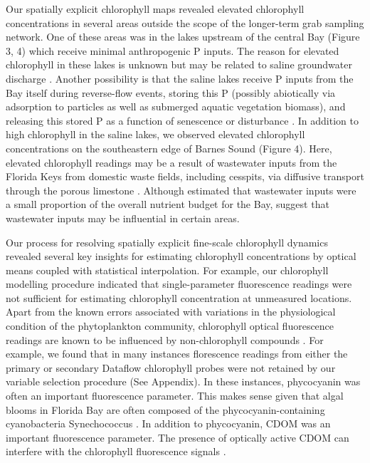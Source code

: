 Our spatially explicit chlorophyll maps revealed elevated chlorophyll concentrations in several areas outside the scope of the longer-term grab sampling network. One of these areas was in the lakes upstream of the central Bay (Figure 3, 4) which receive minimal anthropogenic P inputs. The reason for elevated chlorophyll in these lakes is unknown but may be related to saline groundwater discharge \citep{price2006coastal}. Another possibility is that the saline lakes receive P inputs from the Bay itself during reverse-flow events, storing this P (possibly abiotically via adsorption to particles as well as submerged aquatic vegetation biomass), and releasing this stored P as a function of senescence or disturbance \citep{rudnick1999phosphorus}.  In addition to high chlorophyll in the saline lakes, we observed elevated chlorophyll concentrations on the southeastern edge of Barnes Sound (Figure 4). Here, elevated chlorophyll readings may be a result of wastewater inputs from the Florida Keys from domestic waste fields, including cesspits, via diffusive transport through the porous limestone \citep{rudnick1999phosphorus}. Although \citet{rudnick1999phosphorus} estimated that wastewater inputs were a small proportion of the overall nutrient budget for the Bay, \citet{szmant1996water} suggest that wastewater inputs may be influential in certain areas. 

Our process for resolving spatially explicit fine-scale chlorophyll dynamics revealed several key insights for estimating chlorophyll concentrations by optical means coupled with statistical interpolation. For example, our chlorophyll modelling procedure indicated that single-parameter fluorescence readings were not sufficient for estimating chlorophyll concentration at unmeasured locations. Apart from the known errors associated with variations in the physiological condition of the phytoplankton community, chlorophyll optical fluorescence readings are known to be influenced by non-chlorophyll compounds \citep{proctor2010new}. For example, we found that in many instances florescence readings from either the primary or secondary Dataflow chlorophyll probes were not retained by our variable selection procedure (See Appendix). In these instances, phycocyanin was often an important fluorescence parameter. This makes sense given that algal blooms in Florida Bay are often composed of the phycocyanin-containing cyanobacteria Synechococcus \citep{phlips_blooms_1999}. In addition to phycocyanin, CDOM was an important fluorescence parameter. The presence of optically active CDOM can interfere with the chlorophyll fluorescence signals \citep{proctor2010new}. 

